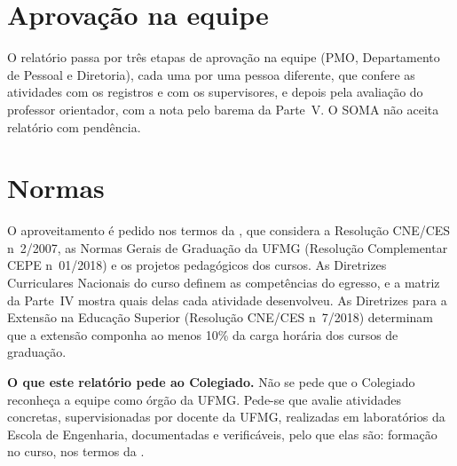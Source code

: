 \section{Aprovação na equipe}

O relatório passa por três etapas de aprovação na equipe (PMO, Departamento de Pessoal e Diretoria),
cada uma por uma pessoa diferente, que confere as atividades com os registros e com os supervisores,
e depois pela avaliação do professor orientador, com a nota pelo barema da Parte~V. O SOMA não aceita
relatório com pendência.

\section{Normas}

O aproveitamento é pedido nos termos da , que considera a Resolução CNE/CES
n\textordmasculine~2/2007, as Normas Gerais de Graduação da UFMG (Resolução Complementar CEPE
n\textordmasculine~01/2018) e os projetos pedagógicos dos cursos. As Diretrizes Curriculares Nacionais
do curso definem as competências do egresso, e a matriz da Parte~IV mostra quais delas cada
atividade desenvolveu. As Diretrizes para a Extensão na Educação Superior (Resolução CNE/CES
n\textordmasculine~7/2018) determinam que a extensão componha ao menos 10\% da carga horária dos
cursos de graduação.

\begin{nota}
  \textbf{O que este relatório pede ao Colegiado.} Não se pede que o Colegiado reconheça a equipe como
  órgão da UFMG. Pede-se que avalie atividades concretas, supervisionadas por docente da UFMG,
  realizadas em laboratórios da Escola de Engenharia, documentadas e verificáveis, pelo que elas são:
  formação no curso, nos termos da .
\end{nota}
